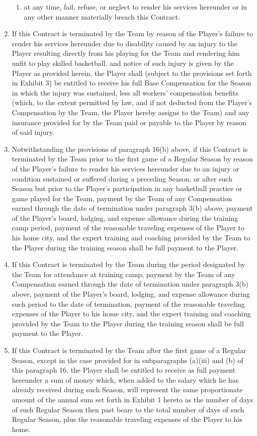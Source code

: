 \documentclass[
]{book}
\begin{document}
\begin{enumerate}
\begin{enumerate}
  \item
    at any time, fail, refuse, or neglect to render his services hereunder or in any other manner materially breach this Contract.
  \end{enumerate}
\item
  If this Contract is terminated by the Team by reason of the Player's failure to render his services hereunder due to disability caused by an injury to the Player resulting directly from his playing for the Team and rendering him unfit to play skilled basketball, and notice of such injury is given by the Player as provided herein, the Player shall (subject to the provisions set forth in Exhibit 3) be entitled to receive his full Base Compensation for the Season in which the injury was sustained, less all workers' compensation benefits (which, to the extent permitted by law, and if not deducted from the Player's Compensation by the Team, the Player hereby assigns to the Team) and any insurance provided for by the Team paid or payable to the Player by reason of said injury.
\item
  Notwithstanding the provisions of paragraph 16(b) above, if this Contract is terminated by the Team prior to the first game of a Regular Season by reason of the Player's failure to render his services hereunder due to an injury or condition sustained or suffered during a preceding Season, or after such Season but prior to the Player's participation in any basketball practice or game played for the Team, payment by the Team of any Compensation earned through the date of termination under paragraph 3(b) above, payment of the Player's board, lodging, and expense allowance during the training camp period, payment of the reasonable traveling expenses of the Player to his home city, and the expert training and coaching provided by the Team to the Player during the training season shall be full payment to the Player.
\item
  If this Contract is terminated by the Team during the period designated by the Team for attendance at training camp, payment by the Team of any Compensation earned through the date of termination under paragraph 3(b) above, payment of the Player's board, lodging, and expense allowance during such period to the date of termination, payment of the reasonable traveling expenses of the Player to his home city, and the expert training and coaching provided by the Team to the Player during the training season shall be full payment to the Player.
\item
  If this Contract is terminated by the Team after the first game of a Regular Season, except in the case provided for in subparagraphs (a)(iii) and (b) of this paragraph 16, the Player shall be entitled to receive as full payment hereunder a sum of money which, when added to the salary which he has already received during such Season, will represent the same proportionate amount of the annual sum set forth in Exhibit 1 hereto as the number of days of such Regular Season then past bears to the total number of days of such Regular Season, plus the reasonable traveling expenses of the Player to his home.

\end{enumerate}
\end{document}
